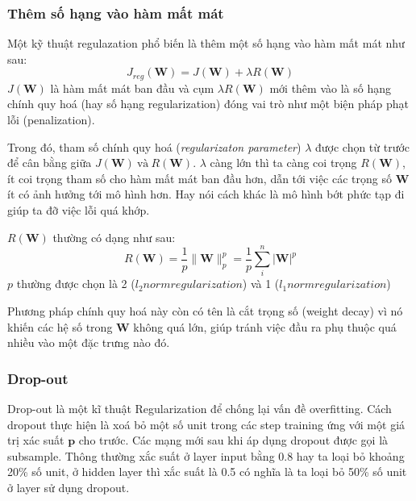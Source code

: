 \subsubsection{Thêm số hạng vào hàm mất mát}
Một kỹ thuật regulazation phổ biến là thêm một số hạng vào hàm mất mát như sau:
\begin{equation}
	J_{reg}(\textbf{W}) = J(\textbf{W})+ \lambda R(\textbf{W})
\end{equation}
$J(\textbf{W})$ là hàm mất mát ban đầu và cụm $ \lambda R(\textbf{W})$  mới thêm vào là số hạng chính quy hoá (hay số hạng regularization) đóng vai trò như một biện pháp phạt lỗi (penalization).\par
Trong đó, tham số chính quy hoá (\textit{regularizaton parameter}) $\lambda$ được chọn từ trước để cân bằng giữa $J(\textbf{W}) ~\text{và}~ R(\textbf{W})$. $\lambda$ càng lớn thì ta càng coi trọng $R(\textbf{W})$, ít coi trọng tham số cho hàm mất mát ban đầu hơn, dẫn tới việc các trọng số $\textbf{W}$ ít có ảnh hưởng tới mô hình hơn. Hay nói cách khác là mô hình bớt phức tạp đi giúp ta đỡ việc lỗi quá khớp.\par
$R(\textbf{W})$ thường có dạng như sau:
\begin{equation}
R(\textbf{W})= \frac{1}{p}\|\textbf{W}\|^p_p = \frac{1}{p}\sum^{n}_i |\textbf{W}|^p
\end{equation}
$p$ thường được chọn là 2 (\textit{$l_2 norm regularization$}) và 1 (\textit{$l_1 norm regularization$})\par
Phương pháp chính quy hoá này còn có tên là cắt trọng số (weight decay) vì nó khiến các hệ số trong $\textbf{W}$ không quá lớn, giúp tránh việc đầu ra phụ thuộc quá nhiều vào một đặc trưng nào đó.
\subsubsection{Drop-out}
Drop-out là một kĩ thuật Regularization để chống lại vấn đề overfitting. Cách dropout thực hiện là xoá bỏ một số unit trong các step training ứng với một giá trị xác suất $\textbf{p}$ cho trước. Các mạng mới sau khi áp dụng dropout được gọi là subsample. Thông thường xắc suất ở layer input bằng 0.8 hay ta loại bỏ khoảng 20\% số unit, ở hidden layer thì xắc suất là 0.5 có nghĩa là ta loại bỏ 50\% số unit ở layer sử dụng dropout.

